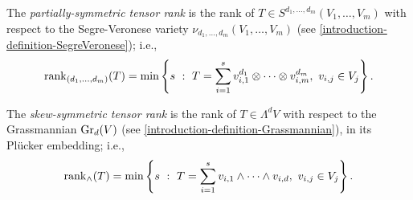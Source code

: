  \begin{definition}
 \label{geometrySecants-definition-partially_symmetric_tensor_rank}
     The \emph{partially-symmetric tensor rank} is the rank of $T \in S^{d_1,\ldots,d_m}(V_1,\ldots,V_m)$ with respect to the Segre-Veronese variety $\nu_{d_1,\ldots,d_m}(V_1,\ldots,V_m)$ (see \ref{introduction-definition-SegreVeronese}); i.e., 
     \[
         \mathrm{rank}_{(d_1,\ldots,d_m)}(T) = \min\left\{s ~:~ T = \sum_{i=1}^s v_{i,1}^{d_1}\otimes \cdots \otimes v_{i,m}^{d_m}, ~ v_{i,j} \in V_j\right\}.
     \]
 \end{definition}
 
 \begin{definition}
 \label{geometrySecants-definition-skewsymmetric_tensor_rank}
     The \emph{skew-symmetric tensor rank} is the rank of $T \in \Lambda^dV$ with respect to the Grassmannian $\mathrm{Gr}_d(V)$ (see \ref{introduction-definition-Grassmannian}), in its Pl\"ucker embedding; i.e., 
     \[
         \mathrm{rank}_{\wedge}(T) = \min\left\{s ~:~ T = \sum_{i=1}^s v_{i,1}\wedge \dots \wedge v_{i,d}, ~ v_{i,j} \in V_j\right\}.
     \]
 \end{definition}
 
 
 